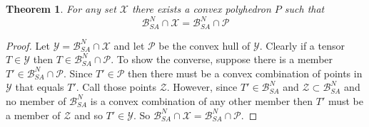 \documentclass{article}
\newtheorem{theorem}{Theorem}
\begin{document}
\begin{theorem}
	For any set $\mathcal{X}$ there exists a convex polyhedron $P$ such that
	\[
	\mathcal{B}^N_{SA} \cap \mathcal{X} = \mathcal{B}^N_{SA} \cap \mathcal{P}
	\]
\end{theorem}
\begin{proof}
	Let $\mathcal{Y} = \mathcal{B}^N_{SA} \cap \mathcal{X}$ and let $\mathcal{P}$ be the convex hull of $\mathcal{Y}$. Clearly if a tensor $T\in \mathcal{Y}$ then $T\in \mathcal{B}^N_{SA} \cap \mathcal{P}$. To show the converse, suppose there is a member $T' \in \mathcal{B}^N_{SA} \cap \mathcal{P}$. Since $T'\in \mathcal{P}$ then there must be a convex combination of points in $\mathcal{Y}$ that equals $T'$. Call those points $\mathcal{Z}$. However, since $T' \in \mathcal{B}^N_{SA}$ and $\mathcal{Z}\subset \mathcal{B}^N_{SA}$ and no member of $\mathcal{B}^N_{SA}$ is a convex combination of any other member then $T'$ must be a member of $\mathcal{Z}$ and so $T'\in \mathcal{Y}$. So $\mathcal{B}^N_{SA} \cap \mathcal{X} = \mathcal{B}^N_{SA} \cap \mathcal{P}$. 
\end{proof}



%
% 


\end{document}
